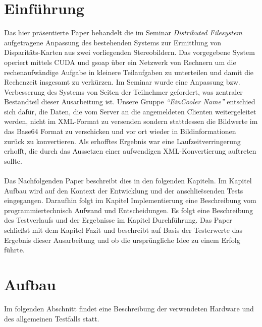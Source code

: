 \section{Einf\"uhrung}

Das hier pr\"asentierte Paper behandelt die im Seminar {\it Distributed Filesystem} aufgetragene Anpassung des bestehenden Systems zur Ermittlung von Disparit\"ats-Karten aus zwei vorliegenden Stereobildern. Das vorgegebene System operiert mittels CUDA und gsoap \"uber ein Netzwerk von Rechnern um die rechenaufw\"andige Aufgabe in kleinere Teilaufgaben zu unterteilen und damit die Rechenzeit insgesamt zu verk\"urzen.
Im Seminar wurde eine Anpassung bzw. Verbesserung des Systems von Seiten der Teilnehmer gefordert, was zentraler Bestandteil dieser Ausarbeitung ist. Unsere Gruppe {\it ``EinCooler Name''} entschied sich daf\"ur, die Daten, die vom Server an die angemeldeten Clienten weitergeleitet werden, nicht im XML-Format zu versenden sondern stattdessen die Bildwerte im das Base64 Format zu verschicken und vor ort wieder in Bildinformationen zur\"uck zu konvertieren. Als erhofftes Ergebnis war eine Laufzeitverringerung erhofft, die durch das Aussetzen einer aufwendigen XML-Konvertierung auftreten sollte.\\\\
Das Nachfolgenden Paper beschreibt dies in den folgenden Kapiteln. Im Kapitel Aufbau wird auf den Kontext der Entwicklung und der anschlie{\"ss}enden Tests eingegangen. Daraufhin folgt im Kapitel Implementierung eine Beschreibung vom programmiertechnisch Aufwand und Entscheidungen. Es folgt eine Beschreibung des Testverlaufs und der Ergebnisse im Kapitel Durchf\"uhrung. Das Paper schlie{\ss}st mit dem Kapitel Fazit und beschreibt auf Basis der Testerwerte das Ergebnis dieser Ausarbeitung und ob die urspr\"ungliche Idee zu einem Erfolg f\"uhrte.

\section{Aufbau}

Im folgenden Abschnitt findet eine Beschreibung der verwendeten Hardware und des allgemeinen Testfalls statt.\\

